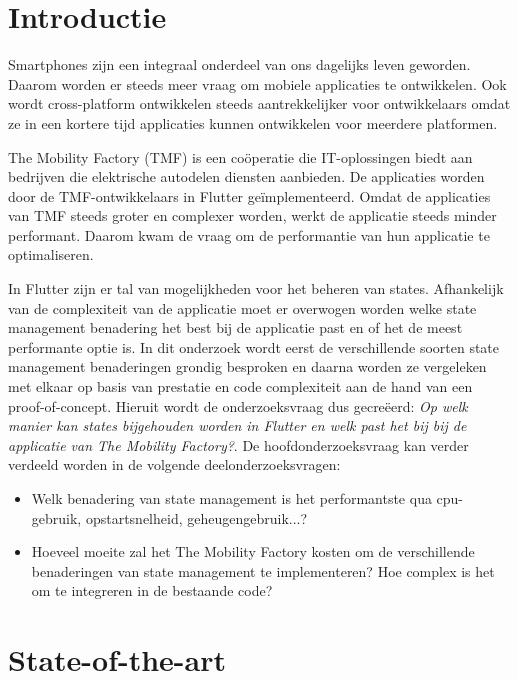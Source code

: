 
\section{Introductie}%
\label{sec:introductie}

Smartphones zijn een integraal onderdeel van ons dagelijks leven geworden. Daarom worden er steeds meer vraag om mobiele applicaties te ontwikkelen. Ook wordt cross-platform ontwikkelen steeds aantrekkelijker voor ontwikkelaars omdat ze in een kortere tijd applicaties kunnen ontwikkelen voor meerdere platformen.

The Mobility Factory (TMF) is een coöperatie die IT-oplossingen biedt aan bedrijven die elektrische autodelen diensten aanbieden. De applicaties worden door de TMF-ontwikkelaars in Flutter geïmplementeerd. Omdat de applicaties van TMF steeds groter en complexer worden, werkt de applicatie steeds minder performant. Daarom kwam de vraag om de performantie van hun applicatie te optimaliseren. 

In Flutter zijn er tal van mogelijkheden voor het beheren van states. Afhankelijk van de complexiteit van de applicatie moet er overwogen worden welke state management benadering het best bij de applicatie past en of het de meest performante optie is. In dit onderzoek wordt eerst de verschillende soorten state management benaderingen grondig besproken en daarna worden ze vergeleken met elkaar op basis van prestatie en code complexiteit aan de hand van een proof-of-concept. Hieruit wordt de onderzoeksvraag dus gecreëerd: \textit{Op welk manier kan states bijgehouden worden in Flutter en welk past het bij bij de applicatie van The Mobility Factory?}. De hoofdonderzoeksvraag kan verder verdeeld worden in de volgende deelonderzoeksvragen: 
\begin{itemize}
  \item Welk benadering van state management is het performantste qua cpu-gebruik, opstartsnelheid, geheugengebruik...?
  \item Hoeveel moeite zal het The Mobility Factory kosten om de verschillende benaderingen van state management te implementeren? Hoe complex is het om te integreren in de bestaande code?
\end{itemize}



\section{State-of-the-art}%
\label{sec:state-of-the-art}

